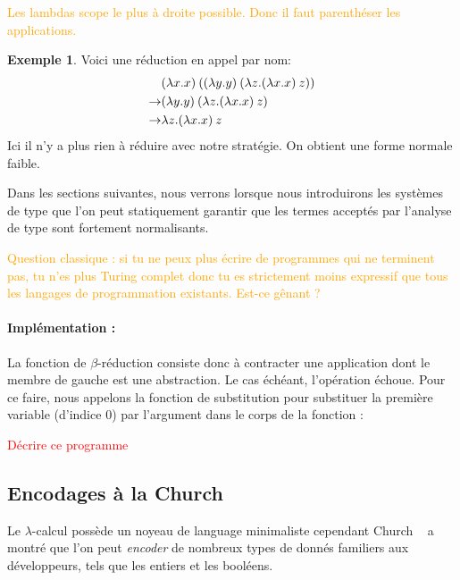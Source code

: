\documentclass {article}
\newcommand{\codefrom}[3]
           {}
\theoremstyle{definition}
\newtheorem{example}{Exemple}
\theoremstyle{remark}
\newcommand{\todo}[1]{\textcolor{red}{#1}}
\newcommand{\attention}[1]{\textcolor{orange}{#1}}
\begin{document}
\attention{Les lambdas scope le plus à droite possible. Donc il faut parenthéser les applications.}

\begin{example}
  Voici une réduction en appel par nom:
  \begin{align*}
    & (\lambda x. x)\:({(\lambda y. y)\:({\lambda z. (\lambda x. x)\:z}})) \\
    \rightarrow & (\lambda y. y)\:({\lambda z. (\lambda x. x)\:z})\\
    \rightarrow & \lambda z. (\lambda x. x)\:z
  \end{align*}
  Ici il n'y a plus rien à réduire avec notre stratégie. On obtient une forme normale faible.
\end{example}

Dans les sections suivantes, nous verrons lorsque nous introduirons
les systèmes de type que l'on peut statiquement garantir que les
termes acceptés par l'analyse de type sont fortement normalisants.

\attention{Question classique : si tu ne peux plus écrire de
  programmes qui ne terminent pas, tu n'es plus Turing complet donc tu
  es strictement moins expressif que tous les langages de
  programmation existants. Est-ce gênant ?}


\paragraph{Implémentation :}
La fonction de $\beta$-réduction consiste donc à contracter une
application dont le membre de gauche est une abstraction. Le cas
échéant, l'opération échoue. Pour ce faire, nous appelons la fonction
de substitution pour substituer la première variable (d'indice \(0\))
par l'argument dans le corps de la fonction :
%
\codefrom{untyped}{lambda}{reduction}

\todo{Décrire ce programme}
\codefrom{untyped}{lambda}{evaluation}


\subsection{Encodages à la Church}

Le $\lambda$-calcul possède un noyeau de language minimaliste
cependant Church ~\citet{church:lambda-calcul} a montré que l'on peut
\emph{encoder} de nombreux types de donnés familiers aux développeurs, tels que
les entiers et les booléens.
\end{document}

